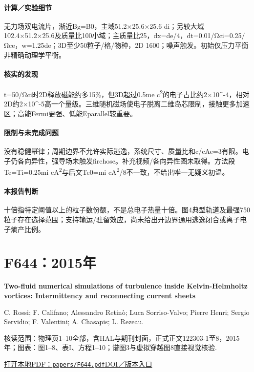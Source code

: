 \paragraph{计算／实验细节}无力场双电流片，渐近Bg=B0，主域51.2×25.6×25.6 di；另较大域102.4×51.2×25.6及质量比100小域；主质量比25，dx=de/4，dt=0.01/Ωci=0.25/Ωce，w=1.25de；3D至少50粒子/格/物种，2D 1600；噪声触发。初始仅压力平衡非精确动理学平衡。

\paragraph{核实的发现}t=50/Ωci时2D释放磁能约多15\%，但3D超过0.5me c\textsuperscript{2}的电子占比约2×10\textasciicircum{}-4，相对2D约2×10\textasciicircum{}-5高一个量级。三维随机磁场使电子脱离二维岛芯限制，接触更多加速区；高能Fermi更强、低能Eparallel较重要。

\paragraph{限制与未完成问题}没有稳健幂律；周期边界不允许实际逃逸，系统尺寸、质量比和c/cAe=3有限。电子仍各向异性，强导场未触发firehose。补充视频/各向异性图未取得。方法段Te=Ti=0.25mi cA\textsuperscript{2}与后文Te0=mi cA\textsuperscript{2}/8不一致，不给出唯一无疑义初温。

\paragraph{本报告判断}十倍指特定阈值以上的粒子数份额，不是总电子热量十倍。图4典型轨道及最强750粒子存在选择范围；支持输运/驻留效应，尚未给出开边界通用逃逸闭合或离子电子熵产比例。

\section{F644：2015年}\label{paper:F644}

\textbf{Two-fluid numerical simulations of turbulence inside Kelvin-Helmholtz vortices: Intermittency and reconnecting current sheets}\citep{F644}\

C. Rossi;  F. Califano;  Alessandro Retinò;  Luca Sorriso‐Valvo;  Pierre Henri;  Sergio Servidio;  F. Valentini;  A. Chasapis;  L. Rezeau.

\textsf{核读范围：}物理页1–10全部，含HAL与期刊封面，正式正文122303-1至8，2015年；\textsf{图表：}图1–8、表I、方程1–10；谱图3与虚拟穿越图8直接视觉核验.

\href{run:papers/F644.pdf}{打开本地PDF：\texttt{papers/F644.pdf}}\quad\href{https://doi.org/10.1063/1.4936795}{DOI／版本入口}

